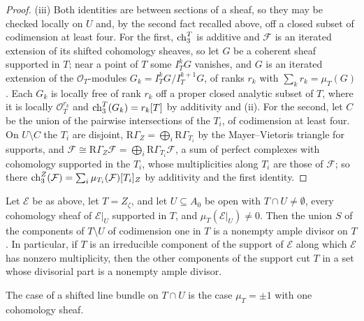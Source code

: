 \begin{proof}
(iii) Both identities are between sections of a sheaf, so they may be checked locally on $U$ and, by the second fact recalled above, off a closed subset of codimension at least four. For the first, $\mathrm{ch}^{T}_{3}$ is additive and $\mathcal{F}$ is an iterated extension of its shifted cohomology sheaves, so let $G$ be a coherent sheaf supported in $T$; near a point of $T$ some $I_{T}^{k}G$ vanishes, and $G$ is an iterated extension of the $\mathcal{O}_{T}$-modules $G_{k}=I_{T}^{k}G/I_{T}^{k+1}G$, of ranks $r_{k}$ with $\sum_{k}r_{k}=\mu_{T}(G)$. Each $G_{k}$ is locally free of rank $r_{k}$ off a proper closed analytic subset of $T$, where it is locally $\mathcal{O}_{T}^{r_{k}}$ and $\mathrm{ch}^{T}_{3}(G_{k})=r_{k}[T]$ by additivity and (ii). For the second, let $C$ be the union of the pairwise intersections of the $T_{i}$, of codimension at least four. On $U\setminus C$ the $T_{i}$ are disjoint, $\mathrm{R}\Gamma_{Z}=\bigoplus_{i}\mathrm{R}\Gamma_{T_{i}}$ by the Mayer--Vietoris triangle for supports, and $\mathcal{F}\cong\mathrm{R}\Gamma_{Z}\mathcal{F}=\bigoplus_{i}\mathrm{R}\Gamma_{T_{i}}\mathcal{F}$, a sum of perfect complexes with cohomology supported in the $T_{i}$, whose multiplicities along $T_{i}$ are those of $\mathcal{F}$; so there $\mathrm{ch}^{Z}_{3}(\mathcal{F})=\sum_{i}\mu_{T_{i}}(\mathcal{F})[T_{i}]_{Z}$ by additivity and the first identity.
\end{proof}

\begin{theorem}[Locality]\label{thm:locality}
Let $\mathcal{E}$ be as above, let $T=Z_{\zeta}$, and let $U\subseteq A_{0}$ be open with $T\cap U\ne\emptyset$, every cohomology sheaf of $\mathcal{E}|_{U}$ supported in $T$, and $\mu_{T}(\mathcal{E}|_{U})\ne0$. Then the union $S$ of the components of $T\setminus U$ of codimension one in $T$ is a nonempty ample divisor on $T$. In particular, if $T$ is an irreducible component of the support of $\mathcal{E}$ along which $\mathcal{E}$ has nonzero multiplicity, then the other components of the support cut $T$ in a set whose divisorial part is a nonempty ample divisor.
\end{theorem}

The case of a shifted line bundle on $T\cap U$ is the case $\mu_{T}=\pm1$ with one cohomology sheaf.

